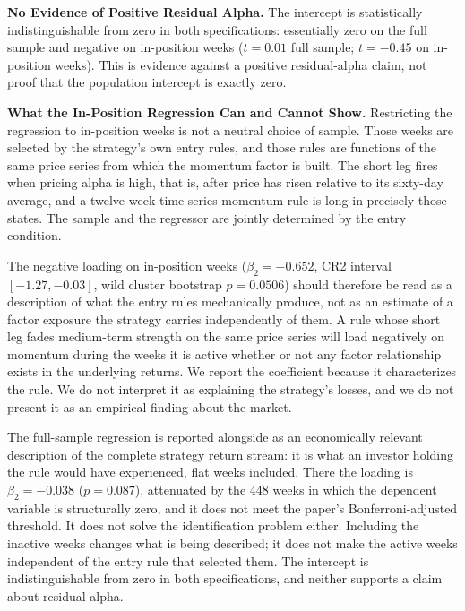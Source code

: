 \documentclass[11pt]{article}
\begin{document}
\textbf{No Evidence of Positive Residual Alpha.} The intercept is statistically indistinguishable from zero in both specifications: essentially zero on the full sample and negative on in-position weeks ($t = 0.01$ full sample; $t = -0.45$ on in-position weeks). This is evidence against a positive residual-alpha claim, not proof that the population intercept is exactly zero.

\textbf{What the In-Position Regression Can and Cannot Show.} Restricting the regression to in-position weeks is not a neutral choice of sample. Those weeks are selected by the strategy's own entry rules, and those rules are functions of the same price series from which the momentum factor is built. The short leg fires when pricing alpha is high, that is, after price has risen relative to its sixty-day average, and a twelve-week time-series momentum rule is long in precisely those states. The sample and the regressor are jointly determined by the entry condition.

The negative loading on in-position weeks ($\beta_2 = -0.652$, CR2 interval $[-1.27, -0.03]$, wild cluster bootstrap $p = 0.0506$) should therefore be read as a description of what the entry rules mechanically produce, not as an estimate of a factor exposure the strategy carries independently of them. A rule whose short leg fades medium-term strength on the same price series will load negatively on momentum during the weeks it is active whether or not any factor relationship exists in the underlying returns. We report the coefficient because it characterizes the rule. We do not interpret it as explaining the strategy's losses, and we do not present it as an empirical finding about the market.

The full-sample regression is reported alongside as an economically relevant description of the complete strategy return stream: it is what an investor holding the rule would have experienced, flat weeks included. There the loading is $\beta_2 = -0.038$ ($p = 0.087$), attenuated by the 448 weeks in which the dependent variable is structurally zero, and it does not meet the paper's Bonferroni-adjusted threshold. It does not solve the identification problem either. Including the inactive weeks changes what is being described; it does not make the active weeks independent of the entry rule that selected them. The intercept is indistinguishable from zero in both specifications, and neither supports a claim about residual alpha.
\end{document}
